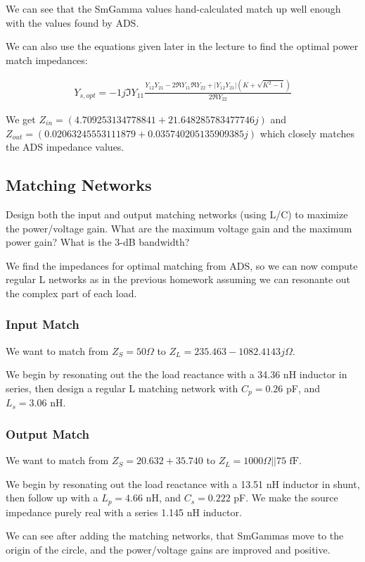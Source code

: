 We can see that the SmGamma values hand-calculated match up well enough with the values found by ADS.

We can also use the equations given later in the lecture to find the optimal power match impedances:

\begin{align*}
    Y_{s,opt} = -1j \Im{Y_{11}} \frac{Y_{12}Y_{21} - 2 \Re{Y_{11}} \Re{Y_{22}} + |Y_{12}Y_{21}|(K + \sqrt{K^2-1})}{2 \Re{Y_{22}}}
\end{align*}

We get $Z_{in} = (4.709253134778841+21.648285783477746j)$ and $Z_{out} =
(0.02063245553111879+0.035740205135909385j)$ which closely matches the ADS impedance values.

\subsection{Matching Networks}
{\color{blue} Design both the input and output matching networks (using L/C) to maximize the power/voltage gain. What are the maximum voltage gain and the maximum power gain? What is the 3-dB bandwidth?}

We find the impedances for optimal matching from ADS, so we can now compute regular L networks as in the previous homework assuming we can resonante out the complex part of each load.

\subsubsection{Input Match}
We want to match from $Z_S = 50 \Omega$ to $Z_L = 235.463 - 1082.4143j \Omega$.

We begin by resonating out the the load reactance with a 34.36 nH inductor in series, then design a regular L matching network with $C_p = 0.26$ pF, and $L_s = 3.06 \text{ nH}$.

\subsubsection{Output Match}
We want to match from $Z_S = 20.632+35.740$ to $Z_L = 1000 \Omega || 75 \text{ fF}$.

We begin by resonating out the load reactance with a 13.51 nH inductor in shunt, then follow up with a $L_p = 4.66$ nH, and $C_s = 0.222$ pF. We make the source impedance purely real with a series 1.145 nH inductor.

We can see after adding the matching networks, that SmGammas move to the origin of the circle, and the power/voltage gains are improved and positive.

